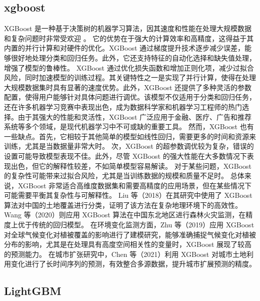 \documentclass[AutoFakeBold]{LZUThesis-PgD&PhD}
\begin{document}
	
	
	
	\subsection{xgboost}

	XGBoost 是一种基于决策树的机器学习算法，因其速度和性能在处理大规模数据和复杂问题时非常受欢迎 \cite{chen2016xgboost}。
	它的优势在于强大的计算效率和高精度，这得益于其内置的并行计算和对硬件的优化。XGBoost 通过梯度提升技术逐步减少误差，能够很好地处理分类和回归任务。此外，它还支持特征的自动化选择和缺失值处理，增强了模型的鲁棒性。
	XGBoost 通过优化损失函数和增加正则化项，减少过拟合风险，同时加速模型的训练过程。其关键特性之一是实现了并行计算，使得在处理大规模数据集时具有显著的速度优势。此外，XGBoost 还提供了多种灵活的参数配置，使得用户能够针对具体问题进行调优。该模型不仅适用于分类和回归任务，还在许多机器学习竞赛中表现出色，成为数据科学家和机器学习工程师的热门选择。由于其强大的性能和灵活性，XGBoost 广泛应用于金融、医疗、广告和推荐系统等多个领域，是现代机器学习中不可或缺的重要工具。
	然而，XGBoost 也有一些缺点。首先，它相较于其他简单的模型如线性回归，需要更多的时间和资源来训练，尤其是当数据量非常大时。
	次，XGBoost 的超参数调优较为复杂，错误的设置可能导致模型表现不佳。此外，尽管 XGBoost 的强大性能在大多数情况下表现出色，但它的解释性较差，不如简单模型容易解读。
	对于某些问题，XGBoost 的复杂性可能带来过拟合风险，尤其是当训练数据的规模和质量不足时。
	总体来说，XGBoost 非常适合高维度数据集和需要高精度的应用场景，但在某些情况下可能需要平衡其复杂性与可解释性。
	Liu 等（2018）在其研究中使用了 XGBoost 算法对中国的土地覆盖进行分类，证明了该方法在复杂地理环境下的高效性\cite{liu2018}。
	Wang 等（2020）则应用 XGBoost 算法在中国东北地区进行森林火灾监测，在精度上优于传统的回归模型\cite{wang2020Y}。
	在环境变化监测方面，Zhu 等（2019）应用 XGBoost 对全球气候变化对植被覆盖的影响进行了建模研究，能够准确捕捉气候变化对植被分布的影响，尤其是在处理具有高度空间相关性的变量时，XGBoost 展现了较高的预测能力\cite{zhu2019}。
	在城市扩张研究中，Chen 等（2021）利用 XGBoost 对城市土地利用变化进行了长时间序列的预测，有效整合多源数据，提升城市扩展预测的精度\cite{chen2021}。
	
	\subsection{LightGBM}
	
\end{document}
